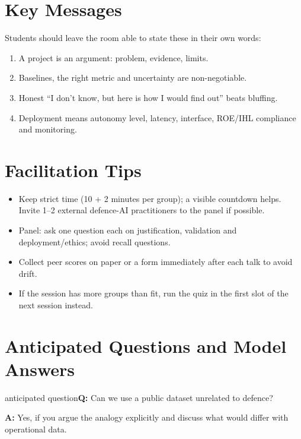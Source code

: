 \documentclass[11pt]{article}
\begin{document}
\section{Key Messages}Students should leave the room able to state these in their own words:\begin{keypoint}\begin{enumerate}\item A project is an argument: problem, evidence, limits.\item Baselines, the right metric and uncertainty are non-negotiable.\item Honest ``I don't know, but here is how I would find out'' beats bluffing.\item Deployment means autonomy level, latency, interface, ROE/IHL compliance and monitoring.\end{enumerate}\end{keypoint}

\section{Facilitation Tips}\begin{itemize}\item Keep strict time (10 + 2 minutes per group); a visible countdown helps. Invite 1--2 external defence-AI practitioners to the panel if possible.\item Panel: ask one question each on justification, validation and deployment/ethics; avoid recall questions.\item Collect peer scores on paper or a form immediately after each talk to avoid drift.\item If the session has more groups than fit, run the quiz in the first slot of the next session instead.\end{itemize}

\section{Anticipated Questions and Model Answers}

\begin{question}{anticipated question}\textbf{Q:} Can we use a public dataset unrelated to defence?\par\smallskip\textbf{A:} Yes, if you argue the analogy explicitly and discuss what would differ with operational data.\end{question}
\end{document}
